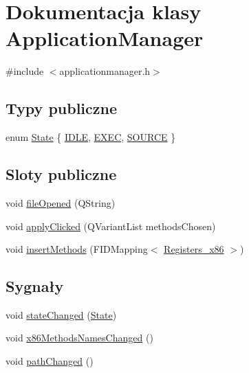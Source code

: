 \hypertarget{class_application_manager}{\section{Dokumentacja klasy Application\-Manager}
\label{class_application_manager}
}


{\ttfamily \#include $<$applicationmanager.\-h$>$}

\subsection*{Typy publiczne}
\begin{DoxyCompactItemize}
\item 
enum \hyperlink{class_application_manager_aeb5af7a2aa47623af5160ea1f20d0243}{State} \{ \hyperlink{class_application_manager_aeb5af7a2aa47623af5160ea1f20d0243a927b180d946b02d50c48311dbf9c3673}{I\-D\-L\-E}, 
\hyperlink{class_application_manager_aeb5af7a2aa47623af5160ea1f20d0243ab12e09b9d69a153189e8f821e9090d2c}{E\-X\-E\-C}, 
\hyperlink{class_application_manager_aeb5af7a2aa47623af5160ea1f20d0243ab5082059863677e68b76bfc68e21e882}{S\-O\-U\-R\-C\-E}
 \}
\end{DoxyCompactItemize}
\subsection*{Sloty publiczne}
\begin{DoxyCompactItemize}
\item 
void \hyperlink{class_application_manager_abbab98616d4848114b4338c8accedef2}{file\-Opened} (Q\-String)
\item 
void \hyperlink{class_application_manager_af1a9357249748e88cdbbcb994d8a7fe0}{apply\-Clicked} (Q\-Variant\-List methods\-Chosen)
\item 
void \hyperlink{class_application_manager_ace0c5e4596d968278acd0b61042472d2}{insert\-Methods} (F\-I\-D\-Mapping$<$ \hyperlink{codedefines_8h_a0f84efe4ca4d99203713a78bd6e8c82e}{Registers\-\_\-x86} $>$)
\end{DoxyCompactItemize}
\subsection*{Sygnały}
\begin{DoxyCompactItemize}
\item 
void \hyperlink{class_application_manager_a0c10f4864788ee7e13730eae75d8c910}{state\-Changed} (\hyperlink{class_application_manager_aeb5af7a2aa47623af5160ea1f20d0243}{State})
\item 
void \hyperlink{class_application_manager_ac64a4e874ce1d4452d37f3b2ce996cda}{x86\-Methods\-Names\-Changed} ()
\item 
void \hyperlink{class_application_manager_ade160ce272f9e98dd59250b399ec1b82}{path\-Changed} ()
\end{DoxyCompactItemize}
